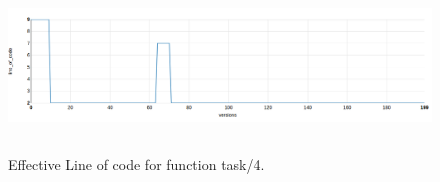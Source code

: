 \begin{figure}[ht]
	\centering
	\includegraphics[height=45mm]{figures/task4.png}
	\caption{Effective Line of code for function task/4.} 
	\label{fig:task4}
\end{figure}